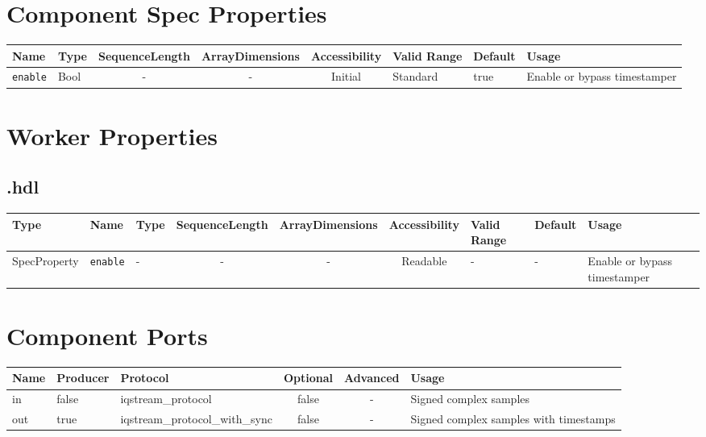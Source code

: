 \begin{landscape}
	\section*{Component Spec Properties}
	\begin{scriptsize}
		\begin{tabular}{|p{3cm}|p{1.5cm}|c|c|c|p{1.5cm}|p{1cm}|p{7cm}|}
			\hline
			\rowcolor{blue}
			Name          & Type & SequenceLength & ArrayDimensions & Accessibility      & Valid Range & Default & Usage                        \\
			\hline
			\verb+enable+ & Bool & -              & -               & Initial 		   & Standard    & true    & Enable or bypass timestamper \\
			\hline
		\end{tabular}
	\end{scriptsize}

	\section*{Worker Properties}
	\subsection*{\comp.hdl}
	\begin{scriptsize}
		\begin{tabular}{|p{2cm}|p{2cm}|p{1cm}|c|c|c|p{2cm}|p{1cm}|p{4cm}|}
			\hline
			\rowcolor{blue}
			Type     & Name                   & Type   & SequenceLength & ArrayDimensions & Accessibility       & Valid Range & Default & Usage                   \\
			\hline
			SpecProperty & \verb+enable+ 	   & - 		& -              & -               & Readable			   & -           & -		& Enable or bypass timestamper \\
			\hline
		\end{tabular}
	\end{scriptsize}

	\section*{Component Ports}
	\begin{scriptsize}
		\begin{tabular}{|M{2cm}|M{1.5cm}|M{4cm}|c|c|M{9cm}|}
			\hline
			\rowcolor{blue}
			Name & Producer & Protocol                       & Optional & Advanced & Usage                                  \\
			\hline
			in   & false    & iqstream\_protocol             & false    & -        & Signed complex samples                 \\
			\hline
			out  & true     & iqstream\_protocol\_with\_sync & false    & -        & Signed complex samples with timestamps \\
			\hline
		\end{tabular}
	\end{scriptsize}

\end{landscape}
